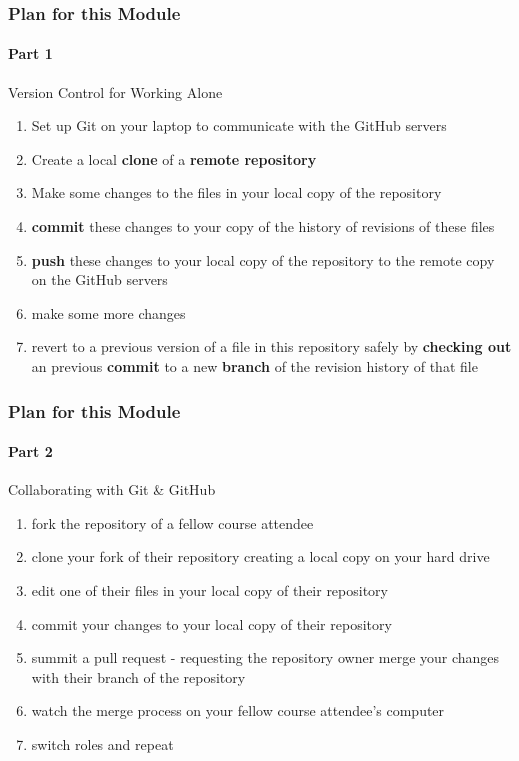 \documentclass[xcolor=dvipsnames]{beamer}
\begin{document}
\begin{frame} 
\frametitle{Plan for this Module}
\framesubtitle{Part 1}
\begin{block}{Version Control for Working Alone}
\begin{enumerate}
\item Set up Git on your laptop to communicate with the GitHub servers
\item Create a local \textbf{clone} of a \textbf{remote repository}
\item Make some changes to the files in your local copy of the repository
\item \textbf{commit} these changes to your copy of the history of revisions of these files 
\item \textbf{push} these changes to your local copy of the repository to the remote copy on the GitHub servers
\item make some more changes
\item revert to a previous version of a file in this repository safely by \textbf{checking out} an previous \textbf{commit} to a new \textbf{branch} of the revision history of that file
\end{enumerate}
\end{block}
\end{frame}

\begin{frame} 
\frametitle{Plan for this Module}
\framesubtitle{Part 2}
\begin{block}{Collaborating with Git \& GitHub}
\begin{enumerate}
\item fork the repository of a fellow course attendee
\item clone your fork of their repository creating a local copy on your hard drive
\item edit one of their files in your local copy of their repository
\item commit your changes to your local copy of their repository
\item summit a pull request - requesting the repository owner merge your changes with their branch of the repository
\item watch the merge process on your fellow course attendee's computer 
\item switch roles and repeat
\end{enumerate}
\end{block}

\end{frame}
\end{document}
